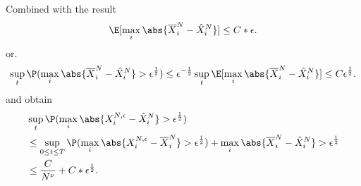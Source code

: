 \begin{corollary}
 Combined with the result 
 \begin{align*}
   \E[\max_i \abs{\overline{X}_i^{N}- \hat{X}_i^{N}  }]\le C*\epsilon
 .\end{align*}
 or. 
 \begin{align*}
   \sup_{t} \P(\max_{i} \abs{\overline{X}_i^{N} - \hat{X}_i^{N}    } > \epsilon ^{\frac{1}{2}} ) \le  \epsilon ^{-\frac{1}{2}}  \sup_{t} \E[\max_i \abs{\overline{X}_i^{N}- \hat{X}_i^{N}  }] \le  C \epsilon ^{\frac{1}{2}} 
 .\end{align*}
 and obtain 
 \begin{align*}
   &\sup_t \P(\max_{i} \abs{X_{i}^{N,\epsilon} - \hat{X}_i^{N} } > \epsilon ^{\frac{1}{2}} )\\
   &\le  \sup_{0 \le  t \le  T} \P(\max_{i} \abs{X_{i}^{N,\epsilon} - \overline{X}_i^{N} } > \epsilon ^{\frac{1}{2}} ) + \max_{i} \abs{\overline{X}_{i}^{N} - \hat{X}_i^{N} } > \epsilon ^{\frac{1}{2}} \\
   &\le \frac{C}{N^{\nu } } + C*\epsilon ^{\frac{1}{2}} 
 .\end{align*}
\end{corollary}
  
